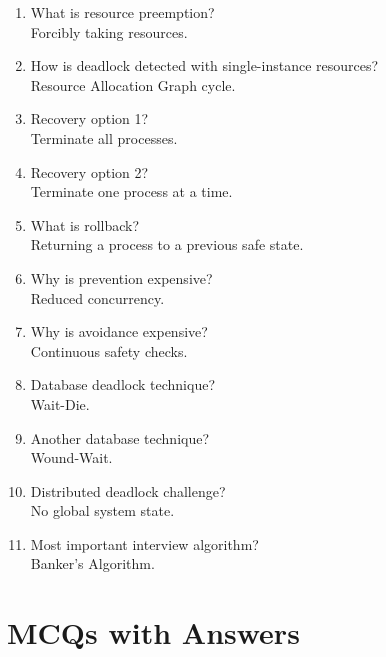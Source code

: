 \begin{enumerate}
\item What is resource preemption?\\
Forcibly taking resources.

\item How is deadlock detected with single-instance resources?\\
Resource Allocation Graph cycle.

\item Recovery option 1?\\
Terminate all processes.

\item Recovery option 2?\\
Terminate one process at a time.

\item What is rollback?\\
Returning a process to a previous safe state.

\item Why is prevention expensive?\\
Reduced concurrency.

\item Why is avoidance expensive?\\
Continuous safety checks.

\item Database deadlock technique?\\
Wait-Die.

\item Another database technique?\\
Wound-Wait.

\item Distributed deadlock challenge?\\
No global system state.

\item Most important interview algorithm?\\
Banker's Algorithm.
\end{enumerate}

\section{MCQs with Answers}

